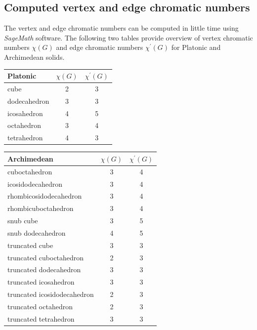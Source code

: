 \subsection{Computed vertex and edge chromatic numbers}

The vertex and edge chromatic numbers can be computed in little time using \textit{SageMath} software. The following two tables provide overview of vertex chromatic numbers $\chi(G)$ and edge chromatic numbers $\chi^{'}(G)$ for Platonic and Archimedean solids.

\begin{center}
\begin{tabular}{|l|c|c|}
\hline
Platonic & $\chi(G)$ & $\chi^{'}(G)$ \\
\hline\hline
cube & 2 & 3 \\
\hline
dodecahedron & 3 & 3 \\
\hline
icosahedron & 4 & 5 \\
\hline
octahedron & 3 & 4 \\
\hline
tetrahedron & 4 & 3 \\
\hline
\end{tabular}
\end{center}

\begin{center}
\begin{tabular}{|l|c|c|}
\hline
Archimedean & $\chi(G)$ & $\chi^{'}(G)$ \\
\hline\hline
cuboctahedron & 3 & 4 \\
\hline
icosidodecahedron & 3 & 4 \\
\hline
rhombicosidodecahedron & 3 & 4 \\
\hline
rhombicuboctahedron & 3 & 4 \\
\hline
snub cube & 3 & 5 \\
\hline
snub dodecahedron & 4 & 5 \\
\hline
truncated cube & 3 & 3 \\
\hline
truncated cuboctahedron & 2 & 3 \\
\hline
truncated dodecahedron & 3 & 3 \\
\hline
truncated icosahedron & 3 & 3 \\
\hline
truncated icosidodecahedron & 2 & 3 \\
\hline
truncated octahedron & 2 & 3 \\
\hline
truncated tetrahedron & 3 & 3 \\
\hline
\end{tabular}
\end{center}


